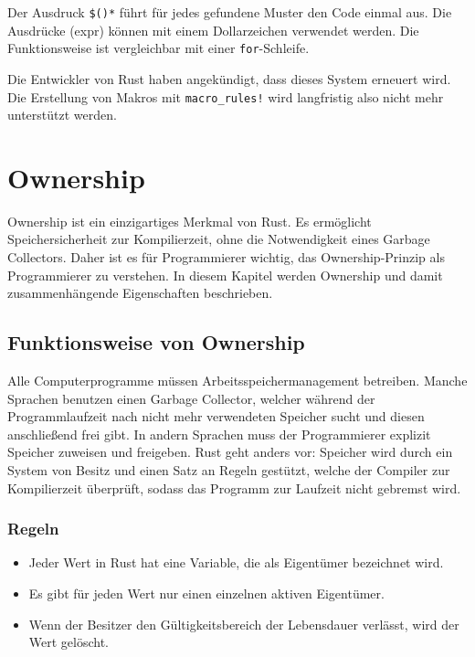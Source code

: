 Der Ausdruck \verb"$()*" führt für jedes gefundene Muster den Code einmal aus. Die Ausdrücke (expr) können mit einem Dollarzeichen verwendet werden. Die Funktionsweise ist vergleichbar mit einer \verb"for"-Schleife.

Die Entwickler von Rust haben angekündigt, dass dieses System erneuert wird. Die Erstellung von Makros mit \verb"macro_rules!" wird langfristig also nicht mehr unterstützt werden.

\section{Ownership}\label{chap:ownership}

Ownership ist ein einzigartiges Merkmal von Rust. Es ermöglicht Speichersicherheit zur Kompilierzeit, ohne die Notwendigkeit eines Garbage Collectors. Daher ist es für Programmierer wichtig, das Ownership-Prinzip als Programmierer zu verstehen. In diesem Kapitel werden Ownership und damit zusammenhängende Eigenschaften beschrieben.

\subsection{Funktionsweise von Ownership}

Alle Computerprogramme müssen Arbeitsspeichermanagement betreiben. Man\-che Sprachen benutzen einen Garbage Collector, welcher während der Programmlaufzeit nach nicht mehr verwendeten Speicher sucht und diesen anschließend frei gibt. In andern Sprachen muss der Programmierer explizit Speicher zuweisen und freigeben. Rust geht anders vor: Speicher wird durch ein System von Besitz und einen Satz an Regeln gestützt, welche der Compiler zur Kompilierzeit überprüft, sodass das Programm zur Laufzeit nicht gebremst wird.

\subsubsection{Regeln}

\begin{itemize}
    \item Jeder Wert in Rust hat eine Variable, die als Eigentümer bezeichnet wird.
    \item Es gibt für jeden Wert nur einen einzelnen aktiven Eigentümer.
    \item Wenn der Besitzer den Gültigkeitsbereich der Lebensdauer verlässt, wird der Wert gelöscht.
\end{itemize}

